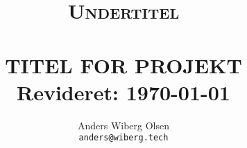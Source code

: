 \title{	\normalsize \textsc{Undertitel} 	%
		 	\\[2.0cm]								%
			\HRule{0.5pt} \\						%
			\LARGE \textbf{\uppercase{Titel for projekt}}	%
			\HRule{2pt} \\ [0.5cm]		%
			\normalsize Revideret: \today			%
		}

\author{
		Anders Wiberg Olsen\\
        \texttt{anders@wiberg.tech}
}